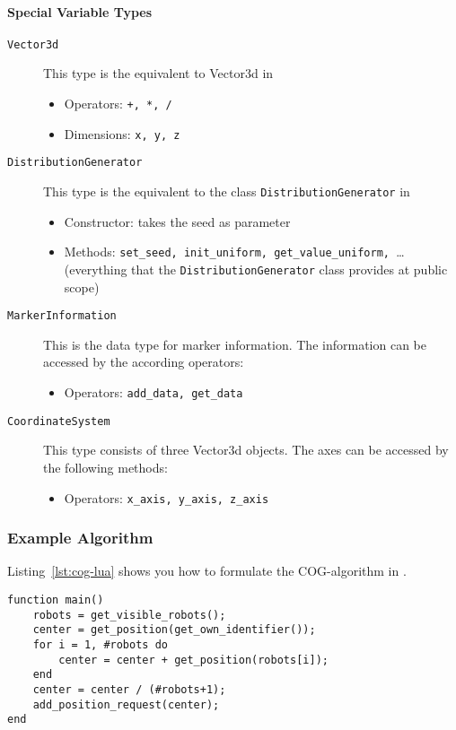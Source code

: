 \paragraph{Special Variable Types}
\begin{description}
	\item [\texttt{Vector3d}] This type is the \Lua equivalent to Vector3d in \RSS
	\begin{itemize}
		\item Operators: \texttt{+, *, /}
		\item Dimensions: \texttt{x, y, z}
	\end{itemize}
	\item [\texttt{DistributionGenerator}] This type is the \Lua equivalent to the class \texttt{DistributionGenerator} in \RSS
	\begin{itemize}
		\item Constructor: takes the seed as parameter
		\item Methods: \texttt{set\_seed, init\_uniform, get\_value\_uniform, }\ldots (everything that the \texttt{DistributionGenerator} class provides at public scope)
	\end{itemize}
	\item [\texttt{MarkerInformation}] This is the data type for marker information. The information can be accessed by the according operators:
	\begin{itemize}
		\item Operators: \texttt{add\_data, get\_data}
	\end{itemize}
	\item [\texttt{CoordinateSystem}] This type consists of three Vector3d objects. The axes can be accessed by the following methods:
	\begin{itemize}
		\item Operators: \texttt{x\_axis, y\_axis, z\_axis}
	\end{itemize}

\end{description}

\subsubsection{Example Algorithm}
Listing~\ref{lst:cog-lua} shows you how to formulate the COG-algorithm in \Lua.

\lstset{language=lua}
\begin{lstlisting}[caption={COG algorithm in \Lua},label=lst:cog-lua]
function main() 
    robots = get_visible_robots();
    center = get_position(get_own_identifier());
    for i = 1, #robots do
        center = center + get_position(robots[i]);
    end
    center = center / (#robots+1);
    add_position_request(center);
end
\end{lstlisting}

